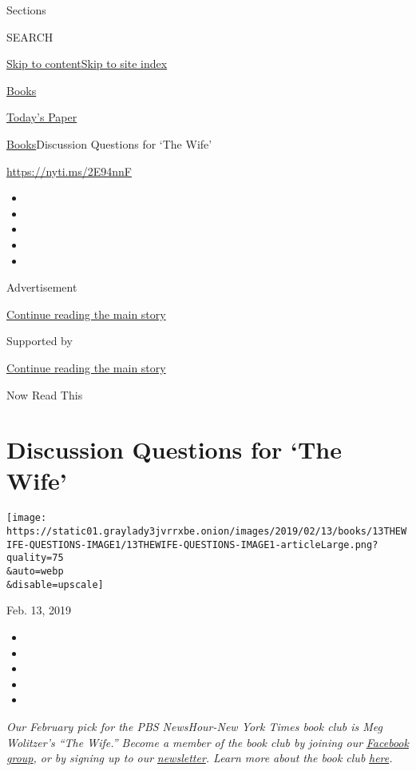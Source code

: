 Sections

SEARCH

\protect\hyperlink{site-content}{Skip to
content}\protect\hyperlink{site-index}{Skip to site index}

\href{https://www.nytimes3xbfgragh.onion/section/books}{Books}

\href{https://myaccount.nytimes3xbfgragh.onion/auth/login?response_type=cookie\&client_id=vi}{}

\href{https://www.nytimes3xbfgragh.onion/section/todayspaper}{Today's
Paper}

\href{/section/books}{Books}\textbar{}Discussion Questions for `The
Wife'

\url{https://nyti.ms/2E94nnF}

\begin{itemize}
\item
\item
\item
\item
\item
\end{itemize}

Advertisement

\protect\hyperlink{after-top}{Continue reading the main story}

Supported by

\protect\hyperlink{after-sponsor}{Continue reading the main story}

Now Read This

\hypertarget{discussion-questions-for-the-wife}{%
\section{Discussion Questions for `The
Wife'}\label{discussion-questions-for-the-wife}}

\texttt{[image: https://static01.graylady3jvrrxbe.onion/images/2019/02/13/books/13THEWIFE-QUESTIONS-IMAGE1/13THEWIFE-QUESTIONS-IMAGE1-articleLarge.png?quality=75\\\&auto=webp\\\&disable=upscale]}

Feb. 13, 2019

\begin{itemize}
\item
\item
\item
\item
\item
\end{itemize}

\emph{Our February pick for the PBS NewsHour-New York Times book club is
Meg Wolitzer's ``The Wife.'' Become a member of the book club by joining
our}
\href{https://www.facebookcorewwwi.onion/groups/NowReadThisBookClub}{\emph{Facebook
group}}\emph{, or by signing up to our}
\href{https://pbs.us1.list-manage.com/subscribe?u=8aa1c620fd96b27384151c36e\&id=2fe6581b35}{\emph{newsletter}}\emph{.
Learn more about the book club}
\href{https://www.pbs.org/newshour/arts/what-is-now-read-this}{\emph{here}}\emph{.}

